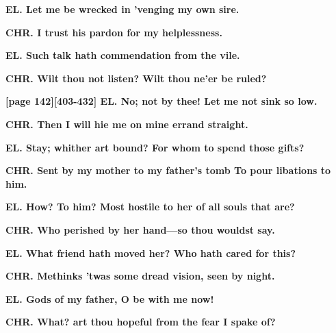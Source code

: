 \documentclass[11pt,letter]{book}
\begin{document}
\par \textbf{EL. Let me be wrecked in ’venging my own sire.}
\par 

\par \textbf{CHR. I trust his pardon for my helplessness.}
\par 

\par \textbf{EL. Such talk hath commendation from the vile.}
\par 

\par \textbf{CHR. Wilt thou not listen? Wilt thou ne’er be ruled?}
\par 

\par \textbf{[page 142][403-432] EL. No; not by thee! Let me not sink so low.}
\par 

\par \textbf{CHR. Then I will hie me on mine errand straight.}
\par 

\par \textbf{EL. Stay; whither art bound? For whom to spend those gifts?}
\par 

\par \textbf{CHR. Sent by my mother to my father’s tomb To pour libations to him.}
\par 

\par \textbf{EL. How? To him? Most hostile to her of all souls that are?}
\par 

\par \textbf{CHR. Who perished by her hand—so thou wouldst say.}
\par 

\par \textbf{EL. What friend hath moved her? Who hath cared for this?}
\par 

\par \textbf{CHR. Methinks ’twas some dread vision, seen by night.}
\par 

\par \textbf{EL. Gods of my father, O be with me now!}
\par 

\par \textbf{CHR. What? art thou hopeful from the fear I spake of?}
\par 
\end{document}
